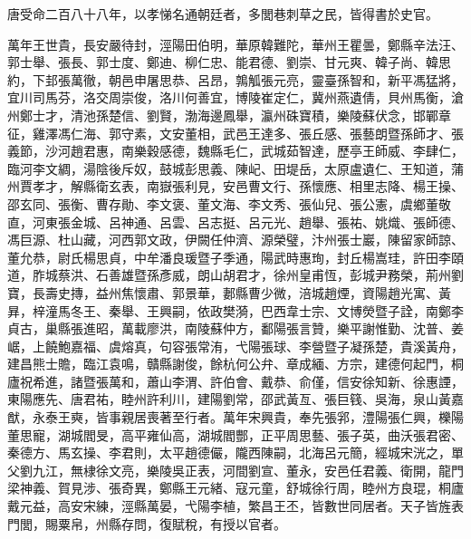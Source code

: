 
\begin{pinyinscope}

 唐受命二百八十八年，以孝悌名通朝廷者，多閭巷刺草之民，皆得書於史官。



 萬年王世貴，長安嚴待封，涇陽田伯明，華原韓難陀，華州王瞿曇，鄭縣辛法汪、郭士舉、張長、郭士度、鄭迪、柳仁忠、能君德、劉崇、甘元爽、韓子尚、韓思約，下邽張萬徹，朝邑申屠思恭、呂昂，鶉觚張元亮，靈臺孫智和，新平馮猛將，宜川司馬芬，洛交周崇俊，洛川何善宜，博陵崔定仁，冀州燕遺倩，貝州馬衡，滄州鄭士才，清池孫楚信、劉賢，渤海邊鳳舉，瀛州硃寶積，樂陵蘇伏念，邯鄲章征，雞澤馮仁海、郭守素，文安董相，武邑王達多、張丘感、張藝朗暨孫師才、張義節，沙河趙君惠，南樂穀感德，魏縣毛仁，武城茹智達，歷亭王師威、李肆仁，臨河李文綢，湯陰後斥奴，鼓城彭思義、陳屺、田堤岳，太原盧遺仁、王知道，蒲州賈孝才，解縣衛玄表，南嶽張利見，安邑曹文行、孫懷應、相里志降、楊王操、邵玄同、張衡、曹存勛、李文褒、董文海、李文秀、張仙兒、張公憲，虞鄉董敬直，河東張金城、呂神通、呂雲、呂志挺、呂元光、趙舉、張祐、姚熾、張師德、馮巨源、杜山藏，河西郭文政，伊闕任仲濟、源榮璧，汴州張士巖，陳留家師諒、董允恭，尉氏楊思貞，中牟潘良瑗暨子季通，陽武時惠珣，封丘楊嵩珪，許田李頤道，胙城蔡洪、石善雄暨孫彥威，朗山胡君才，徐州皇甫恆，彭城尹務榮，荊州劉寶，長壽史摶，益州焦懷肅、郭景華，郪縣曹少微，涪城趙煙，資陽趙光寓、黃昪，梓潼馬冬王、秦舉、王興嗣，依政樊漪，巴西韋士宗、文博熒暨子詮，南鄭李貞古，巢縣張進昭，萬載廖洪，南陵蘇仲方，鄱陽張言贊，樂平謝惟勤、沈普、姜崌，上饒鮑嘉福、虞熔真，句容張常洧，弋陽張球、李營暨子凝孫楚，貴溪黃舟，建昌熊士贍，臨江袁鳴，贛縣謝俊，餘杭何公弁、章成緬、方宗，建德何起門，桐廬祝希進，諸暨張萬和，蕭山李渭、許伯會、戴恭、俞僅，信安徐知新、徐惠諲，東陽應先、唐君祐，睦州許利川，建陽劉常，邵武黃亙、張巨篯、吳海，泉山黃嘉猷，永泰王奭，皆事親居喪著至行者。萬年宋興貴，奉先張郛，澧陽張仁興，櫟陽董思寵，湖城閻旻，高平雍仙高，湖城閻酆，正平周思藝、張子英，曲沃張君密、秦德方、馬玄操、李君則，太平趙德儼，隴西陳嗣，北海呂元簡，經城宋洸之，單父劉九江，無棣徐文亮，樂陵吳正表，河間劉宣、董永，安邑任君義、衛開，龍門梁神義、賀見涉、張奇異，鄭縣王元緒、寇元童，舒城徐行周，睦州方良琨，桐廬戴元益，高安宋練，涇縣萬晏，弋陽李植，繁昌王丕，皆數世同居者。天子皆旌表門閭，賜粟帛，州縣存問，復賦稅，有授以官者。




\end{pinyinscope}
